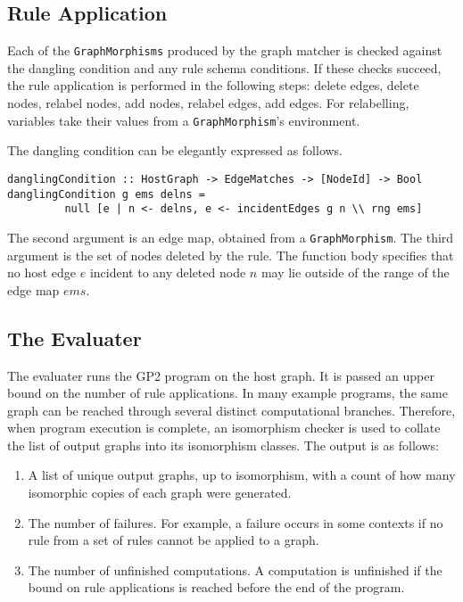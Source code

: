 \subsection{Rule Application}
Each of the \texttt{GraphMorphisms} produced by the graph matcher is checked against the dangling condition and any rule schema conditions. If these checks succeed, the rule application is performed in the following steps: delete edges, delete nodes, relabel nodes, add nodes, relabel edges, add edges. For relabelling, variables take their values from a \texttt{GraphMorphism}'s environment. 

The dangling condition can be elegantly expressed as follows.
\begin{verbatim}
danglingCondition :: HostGraph -> EdgeMatches -> [NodeId] -> Bool
danglingCondition g ems delns = 
         null [e | n <- delns, e <- incidentEdges g n \\ rng ems]
\end{verbatim}

The second argument is an edge map, obtained from a \texttt{GraphMorphism}. The third argument is the set of nodes deleted by the rule. The function body specifies that no host edge $e$ incident to any deleted node $n$ may lie outside of the range of the edge map $ems$.

\subsection{The Evaluater}\label{sec:eval}
The evaluater runs the GP2 program on the host graph. It is passed an upper bound on the number of rule applications. In many example programs, the same graph can be reached through several distinct computational branches. Therefore, when program execution is complete, an isomorphism checker is used to collate the list of output graphs into its isomorphism classes. The output is as follows:

\begin{enumerate}
\item A list of unique output graphs, up to isomorphism, with a count of how many isomorphic copies of each graph were generated.
\item The number of failures. For example, a failure occurs in some contexts if no rule from a set of rules cannot be applied to a graph.
\item The number of unfinished computations. A computation is unfinished if the bound on rule applications is reached before the end of the program.
\end{enumerate}


